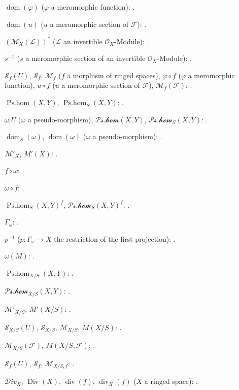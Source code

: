 $\operatorname{dom}(\varphi)$ ($\varphi$ a meromorphic function):
.

$\operatorname{dom}(u)$ ($u$ a meromorphic section of $\mathcal F$):
.

$(\mathcal M_X(\mathcal L))^{*}$
($\mathcal L$ an invertible $\mathcal O_X$-Module):
.

$s^{-1}$ ($s$ a meromorphic section of an invertible
$\mathcal O_X$-Module): .

$\mathcal S_f(U)$, $\mathcal S_f$, $\mathcal M_f$
($f$ a morphism of ringed spaces), $\varphi\circ f$ ($\varphi$ a
meromorphic function), $u\circ f$ ($u$ a meromorphic section of
$\mathcal F$), $\mathcal M_f(\mathcal F)$: .

$\operatorname{Ps.hom}(X,Y)$, $\operatorname{Ps.hom}_S(X,Y)$:
.

$\omega|U$ ($\omega$ a pseudo-morphism),
$\mathcal{Ps.hom}(X,Y)$, $\mathcal{Ps.hom}_S(X,Y)$:
.

$\operatorname{dom}_S(\omega)$, $\operatorname{dom}(\omega)$
($\omega$ a pseudo-morphism): .

$\mathcal M'_X$, $M'(X)$: .

$f\circ\omega$: .

$\omega\circ f$: .

$\operatorname{Ps.hom}_S(X,Y)^f$,
$\mathcal{Ps.hom}_S(X,Y)^f$: .

$\Gamma_\omega$: .

$p^{-1}$ ($p:\Gamma_\omega\to X$ the restriction of the first
projection): .

$\omega(M)$: .

$\operatorname{Ps.hom}_{X/S}(X,Y)$: .

$\mathcal{Ps.hom}_{X/S}(X,Y)$: .

$\mathcal M'_{X/S}$, $M'(X/S)$: .

$\mathcal S_{X/S}(U)$, $\mathcal S_{X/S}$, $\mathcal M_{X/S}$,
$M(X/S)$: .

$\mathcal M_{X/S}(\mathcal F)$, $M(X/S,\mathcal F)$:
.

$\mathcal S_f(U)$, $\mathcal S_f$, $\mathcal M_{X/S,f}$:
.

$\mathcal{D}iv_X$, $\operatorname{Div}(X)$, $\operatorname{div}(f)$,
$\operatorname{div}_X(f)$ ($X$ a ringed space): .

